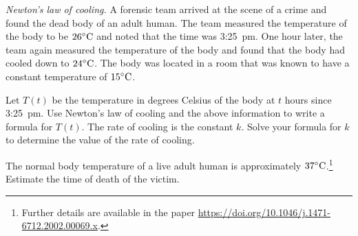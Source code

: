 \documentclass[a4paper,oneside,12pt]{article}
\begin{document}
\begin{problem}
\item\emph{Newton's law of cooling.}
  A forensic team arrived at the scene of a crime and found the dead
  body of an adult human.  The team measured the temperature of the
  body to be ${26}^{\circ}\textrm{C}$ and noted that the time was 3:25~pm.  One
  hour later, the team again measured the temperature of the body and
  found that the body had cooled down to ${24}^{\circ}\textrm{C}$.  The body was
  located in a room that was known to have a constant temperature of
  ${15}^{\circ}\textrm{C}$.
  \begin{packedenum}
  \item\label{subprob:logarithm:Newton_forensic_formula}
    Let $T(t)$ be the temperature in degrees Celsius of the body at
    $t$ hours since 3:25~pm.  Use Newton's law of cooling and the
    above information to write a formula for $T(t)$.  The rate of
    cooling is the constant $k$.  Solve your formula for $k$ to
    determine the value of the rate of cooling.

  \item\label{subprob:logarithm:Newton_forensic_time_of_death}
    The normal body temperature of a live adult human is approximately
    ${37}^{\circ}\textrm{C}$.\footnote{
      Further details are available in the paper
      \url{https://doi.org/10.1046/j.1471-6712.2002.00069.x}.
    }
    Estimate the time of death of the victim.
  \end{packedenum}
\end{problem}
\end{document}
